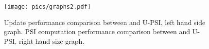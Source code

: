 \vspace{-4mm}

\begin{figure}
\centering
\texttt{[image: pics/graphs2.pdf]}
\caption{\small Update performance comparison between \cite{eopsi} and U-PSI, left hand side graph. PSI computation performance comparison between \cite{eopsi} and U-PSI, right hand size graph. }\label{performance}
\end{figure}

\vspace{-9mm}



%









%
%		
%

